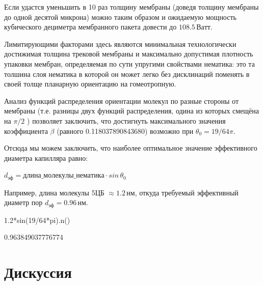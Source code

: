 \documentclass[11pt]{article}
\begin{document}
    Если удастся уменьшить в 10 раз толщину мембраны (доведя толщину
мембраны до одной десятой микрона) можно таким образом и ожидаемую
мощность кубического дециметра мембранного пакета довести до
\(108.5\,Ватт\).

Лимитирующими факторами здесь являются минимальная технологически
достижимая толщина трековой мембраны и максимально допустимая плотность
упаковки мембран, определяемая по сути упругими свойствами нематика: это
та толшина слоя нематика в которой он может легко без дисклинаций
поменять в своей толще планарную ориентацию на гомеотропную.

    Анализ функций распределения ориентации молекул по разные стороны от
мембраны (т.е. разницы двух функций распределения, одина из которых
смещёна на \(\pi/2\) ) позволяет заключить, что достигнуть максимального
значения коэффициента \(\beta\) (равного 0.118037890843680) возможно при
\(\theta_0 = 19/64 \pi\).

Отсюда мы можем заключить, что наиболее оптимальное значение
эффективного диаметра капилляра равно:

\(d_{эф} = длина\_молекулы\_нематика \cdot sin\, \theta_0\)

Например, длина молекулы 5ЦБ \(\approx 1.2\,нм\), откуда требуемый
эффективный диаметр пор \(d_{эф} = 0.96\,нм\).


1.2*sin(19/64*pi).n()


0.963849037776774
        
    \section{Дискуссия}\label{ux434ux438ux441ux43aux443ux441ux441ux438ux44f}
\end{document}
